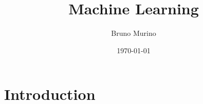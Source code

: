 \documentclass{___mymonograph}
\title{Machine Learning} %
\author{Bruno Murino} %
\date{\today} %
\begin{document}
\chapter{Introduction}
\minitoc









\end{document}
